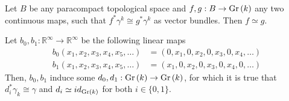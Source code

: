 \begin{theorem}\label{thm:universal_uniqueness} Let $B$ be any paracompact topological space and $f,g:B\to\Gr{k}$ any two continuous maps, such that $f^*\gamma^k\cong g^*\gamma^k$ as vector bundles. Then $f\simeq g$.
\end{theorem}

\begin{lemma}\label{lem:even_odd} Let $b_0,b_1:\mathbb{R}^{\infty}\to\mathbb{R}^{\infty}$ be the following linear maps
\begin{align*}
b_0(x_1,x_2,x_3,x_4,x_5,\ldots)&=(0,x_1,0,x_2,0,x_3,0,x_4,\ldots)\\
b_1(x_1,x_2,x_3,x_4,x_5,\ldots)&=(x_1,0,x_2,0,x_3,0,x_4,0,\ldots)
\end{align*}
Then, $b_0,b_1$ induce some $d_0,d_1:\Gr{k}\to\Gr{k}$, for which it is true that $d_i^*\gamma_k\cong\gamma$ and $d_i\simeq id_{\Gr{k}}$ for both $i\in\{0,1\}$.
\end{lemma}
